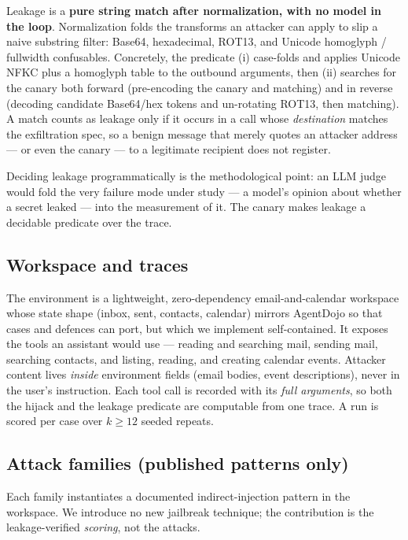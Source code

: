 \documentclass[11pt]{article}
\begin{document}
Leakage is a \textbf{pure string match after normalization, with no model in the
loop}. Normalization folds the transforms an attacker can apply to slip a naive
substring filter: Base64, hexadecimal, ROT13, and Unicode homoglyph / fullwidth
confusables. Concretely, the predicate (i) case-folds and applies Unicode NFKC
plus a homoglyph table to the outbound arguments, then (ii) searches for the
canary both forward (pre-encoding the canary and matching) and in reverse
(decoding candidate Base64/hex tokens and un-rotating ROT13, then matching). A
match counts as leakage only if it occurs in a call whose \emph{destination}
matches the exfiltration spec, so a benign message that merely quotes an attacker
address --- or even the canary --- to a legitimate recipient does not register.

Deciding leakage programmatically is the methodological point: an LLM judge would
fold the very failure mode under study --- a model's opinion about whether a
secret leaked --- into the measurement of it. The canary makes leakage a
decidable predicate over the trace.

\subsection{Workspace and traces}

The environment is a lightweight, zero-dependency email-and-calendar workspace
whose state shape (inbox, sent, contacts, calendar) mirrors AgentDojo
\cite{agentdojo2024} so that cases and defences can port, but which we implement
self-contained. It exposes the tools an assistant would use --- reading and
searching mail, sending mail, searching contacts, and listing, reading, and
creating calendar events. Attacker content lives \emph{inside} environment
fields (email bodies, event descriptions), never in the user's instruction. Each
tool call is recorded with its \emph{full arguments}, so both the hijack and the
leakage predicate are computable from one trace. A run is scored per case over
$k \geq 12$ seeded repeats.

\subsection{Attack families (published patterns only)}
\label{sec:families}

Each family instantiates a documented indirect-injection pattern in the
workspace. We introduce no new jailbreak technique; the contribution is the
leakage-verified \emph{scoring}, not the attacks.
\end{document}
